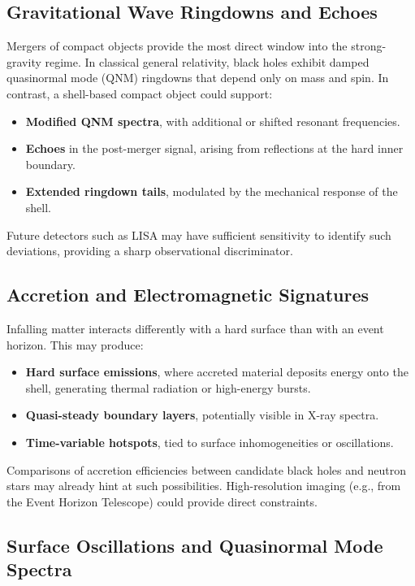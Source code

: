 \documentclass[12pt]{article}
\begin{document}
\subsection{Gravitational Wave Ringdowns and Echoes}

Mergers of compact objects provide the most direct window into the strong-gravity regime. In classical general relativity, black holes exhibit damped quasinormal mode (QNM) ringdowns that depend only on mass and spin. In contrast, a shell-based compact object could support:

\begin{itemize}
    \item \textbf{Modified QNM spectra}, with additional or shifted resonant frequencies.
    \item \textbf{Echoes} in the post-merger signal, arising from reflections at the hard inner boundary.
    \item \textbf{Extended ringdown tails}, modulated by the mechanical response of the shell.
\end{itemize}

Future detectors such as LISA may have sufficient sensitivity to identify such deviations, providing a sharp observational discriminator.

\subsection{Accretion and Electromagnetic Signatures}

Infalling matter interacts differently with a hard surface than with an event horizon. This may produce:

\begin{itemize}
    \item \textbf{Hard surface emissions}, where accreted material deposits energy onto the shell, generating thermal radiation or high-energy bursts.
    \item \textbf{Quasi-steady boundary layers}, potentially visible in X-ray spectra.
    \item \textbf{Time-variable hotspots}, tied to surface inhomogeneities or oscillations.
\end{itemize}

Comparisons of accretion efficiencies between candidate black holes and neutron stars may already hint at such possibilities. High-resolution imaging (e.g., from the Event Horizon Telescope) could provide direct constraints.

\newpage
\subsection{Surface Oscillations and Quasinormal Mode Spectra}
\end{document}
